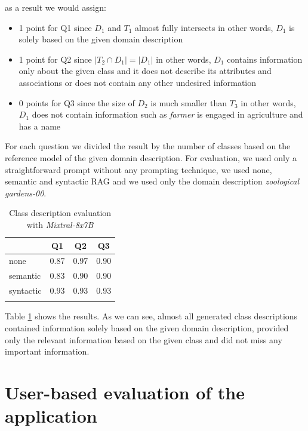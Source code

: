 as a result we would assign:

\begin{itemize}
\item 1 point for Q1 since $D_1$ and $T_1$ almost fully intersects in other words, $D_1$ is solely based on the given domain description
\item 1 point for Q2 since $|T_2 \cap D_1| = |D_1|$ in other words, $D_1$ contains information only about the given class and it does not describe its attributes and associations or does not contain any other undesired information
\item 0 points for Q3 since the size of $D_2$ is much smaller than $T_3$ in other words, $D_1$ does not contain information such as \textit{farmer} is engaged in agriculture and has a name
\end{itemize}

For each question we divided the result by the number of classes based on the reference model of the given domain description. For evaluation, we used only a straightforward prompt without any prompting technique, we used none, semantic and syntactic RAG and we used only the domain description \emph{zoological gardens-00}.

\begin{table}[!h]
    \scriptsize
    \centering
    \setlength{\tabcolsep}{0.5em}
    \begin{tabular}{lccc}
     \toprule
        & Q1 & Q2 & Q3 \\
    \toprule
    
    \addlinespace
         none       & 0.87 & 0.97 & 0.90 \\
    	 semantic   & 0.83 & 0.90 & 0.90 \\
         syntactic  & 0.93 & 0.93 & 0.93 \\
    \addlinespace
    \bottomrule
    \addlinespace
    \end{tabular}
    \caption{Class description evaluation with \emph{Mixtral-8x7B}}
    \label{tab:mixtral-classes-descriptions}
\end{table}

Table \ref{tab:mixtral-classes-descriptions} shows the results. As we can see, almost all generated class descriptions contained information solely based on the given domain description, provided only the relevant information based on the given class and did not miss any important information.


\section{User-based evaluation of the application}

